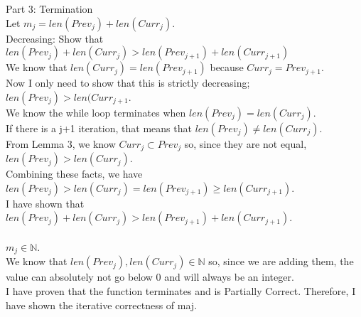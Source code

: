 \documentclass[12pt]{article}
\begin{document}
Part 3: Termination\\
Let $m_j = len(Prev_j) + len(Curr_j)$.\\
Decreasing: Show that $len(Prev_j) + len(Curr_j) > len(Prev_{j+1}) + len(Curr_{j+1})$\\
We know that $len(Curr_j) = len(Prev_{j+1})$ because $Curr_j = Prev_{j+1}$.\\
Now I only need to show that this is strictly decreasing; $len(Prev_j) > len(Curr_{j+1}$.\\
We know the while loop terminates when $len(Prev_j) = len(Curr_j)$.\\
If there is a j+1 iteration, that means that $len(Prev_j) \not = len(Curr_j)$.\\
From Lemma 3, we know $Curr_j \subset Prev_j$ so, since they are not equal, $len(Prev_j) > len(Curr_j)$.\\
Combining these facts, we have $len(Prev_j) > len(Curr_j) = len(Prev_{j+1}) \geq len(Curr_{j+1})$.\\
I have shown that $len(Prev_j) + len(Curr_j) > len(Prev_{j+1}) + len(Curr_{j+1})$.\\
\\
$m_j \in \mathbb{N}$.\\
We know that $len(Prev_j), len(Curr_j) \in \mathbb{N}$ so, since we are adding them, the value can absolutely not go below 0 and will always be an integer.\\
I have proven that the function terminates and is Partially Correct. Therefore, I have shown the iterative correctness of maj.\\
\end{document}
